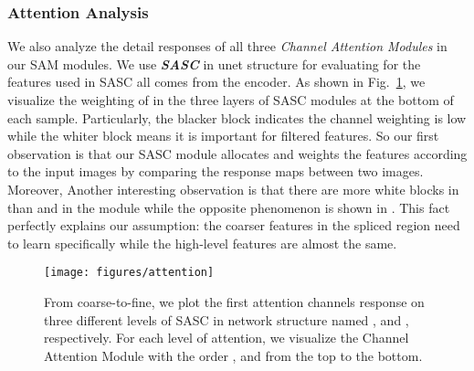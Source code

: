\subsubsection{Attention Analysis}
\label{sec:attaly}

We also analyze the detail responses of all three \textit{Channel Attention Modules} in our SAM modules. We use \textbf{\textit{SASC}} in unet structure for evaluating for the features used in SASC all comes from the encoder. As shown in Fig.~\ref{figure:attention_analysis}, 
we visualize the weighting of  in the three layers of SASC modules at the bottom of each sample. 
Particularly, the blacker block indicates the channel weighting is low while the whiter block means it is important for filtered features. So our first observation is that our SASC module allocates and weights the features according to the input images by comparing the response maps between two images. Moreover, Another interesting observation is that there are more white blocks in  than  and  in the  module while the opposite phenomenon is shown in . This fact perfectly explains our assumption: the coarser features in the spliced region need to learn specifically while the high-level features are almost the same.


\begin{figure}[h]
	\centering
	\texttt{[image: figures/attention]}

	\caption{From coarse-to-fine, we plot the first  attention channels response on three different levels of SASC in network structure named ,  and , respectively. For each level of attention, we visualize the Channel Attention Module with the order ,  and  from the top to the bottom.}
	\label{figure:attention_analysis}

\end{figure}

